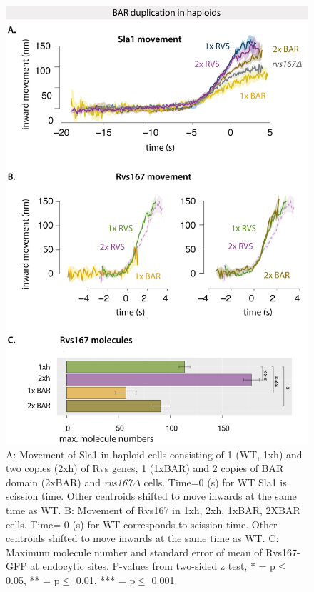 		\begin{figure}[H]
		\vspace*{-2 mm}
		\includegraphics[width=21cm,height=21 cm,keepaspectratio]{figures/results_final/scaffolding_overlaid3}
		\caption [Overexpression of the Rvs BAR domain]
		{A: Movement of Sla1 in haploid cells consisting of 1 (WT, 1xh) and two copies (2xh) of Rvs genes, 1 (1xBAR) and 2 copies of BAR domain (2xBAR) and  \textit{rvs167$\Delta$} cells. Time=0 (s) for WT Sla1 is scission time. Other centroids shifted to move inwards at the same time as WT.
		B: Movement of Rvs167 in 1xh, 2xh, 1xBAR, 2XBAR cells. Time= 0 (s) for WT corresponds to scission time. Other centroids shifted to move inwards at the same time as WT.
		C: Maximum molecule number and standard error of mean of Rvs167-GFP at endocytic sites. P-values from two-sided z test, * = p$\leq$ 0.05, ** = p$\leq$ 0.01, *** = p$\leq$ 0.001. }
		\label{fig_scaffold}
		\end{figure}


